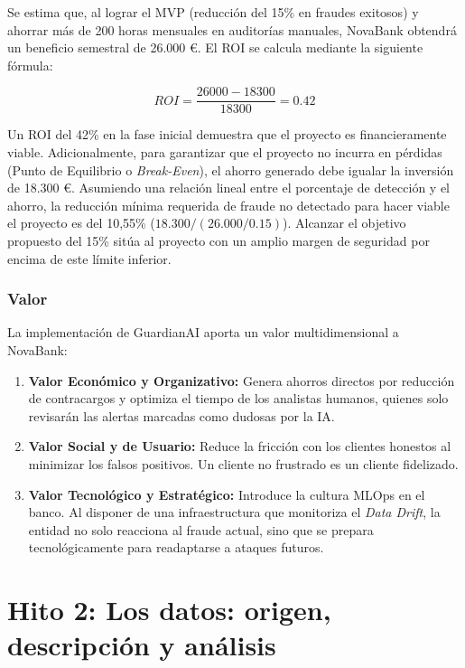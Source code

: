 \documentclass[12pt,a4paper]{report}
\begin{document}
Se estima que, al lograr el MVP (reducción del 15\% en fraudes exitosos) y ahorrar más de 200 horas mensuales en auditorías manuales, NovaBank obtendrá un beneficio semestral de 26.000 \euro. El ROI se calcula mediante la siguiente fórmula:

\begin{equation}
ROI = \frac{26000 - 18300}{18300} = 0.42
\end{equation}

Un ROI del 42\% en la fase inicial demuestra que el proyecto es financieramente viable. Adicionalmente, para garantizar que el proyecto no incurra en pérdidas (Punto de Equilibrio o \textit{Break-Even}), el ahorro generado debe igualar la inversión de 18.300 \euro. Asumiendo una relación lineal entre el porcentaje de detección y el ahorro, la reducción mínima requerida de fraude no detectado para hacer viable el proyecto es del 10,55\% ($18.300 / (26.000 / 0.15)$). Alcanzar el objetivo propuesto del 15\% sitúa al proyecto con un amplio margen de seguridad por encima de este límite inferior.

\subsection{Valor}
La implementación de GuardianAI aporta un valor multidimensional a NovaBank:
\begin{enumerate}
    \item \textbf{Valor Económico y Organizativo:} Genera ahorros directos por reducción de contracargos y optimiza el tiempo de los analistas humanos, quienes solo revisarán las alertas marcadas como dudosas por la IA.
    \item \textbf{Valor Social y de Usuario:} Reduce la fricción con los clientes honestos al minimizar los falsos positivos. Un cliente no frustrado es un cliente fidelizado.
    \item \textbf{Valor Tecnológico y Estratégico:} Introduce la cultura MLOps en el banco. Al disponer de una infraestructura que monitoriza el \textit{Data Drift}, la entidad no solo reacciona al fraude actual, sino que se prepara tecnológicamente para readaptarse a ataques futuros.
\end{enumerate}

\chapter{Hito 2: Los datos: origen, descripción y análisis}
\label{ch:hito2}
\end{document}
